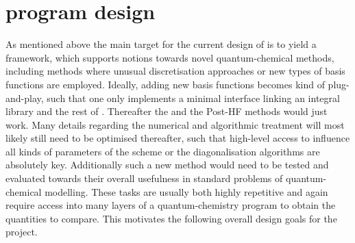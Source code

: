 \section{\molsturm program design}
\label{sec:MolsturmDesign}

As mentioned above the main target for the current design of \molsturm
is to yield a framework,
which supports notions towards novel quantum-chemical methods,
including methods where unusual discretisation approaches
or new types of basis functions are employed.
Ideally, adding new basis functions becomes kind of plug-and-play,
such that one only implements a minimal interface
linking an integral library and the rest of \molsturm.
Thereafter the \SCF and the Post-HF methods would just work.
Many details regarding the numerical and algorithmic treatment
will most likely still need to be optimised thereafter,
such that high-level access to influence
all kinds of parameters of the \SCF scheme or the
diagonalisation algorithms are absolutely key.
Additionally such a new method would need to be tested and evaluated
towards their overall usefulness in standard problems
of quantum-chemical modelling.
These tasks are usually both highly repetitive and again
require access into many layers of a quantum-chemistry program
to obtain the quantities to compare.
This motivates the following overall design goals for the \molsturm project.

